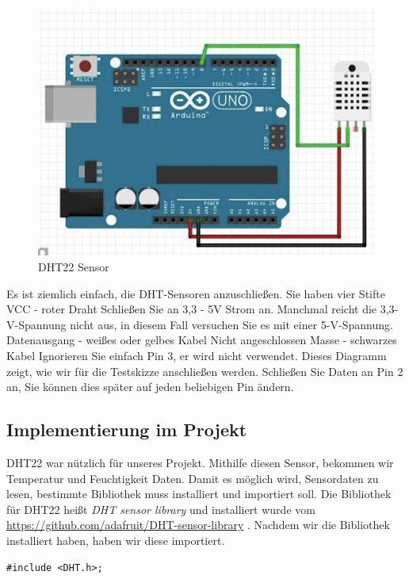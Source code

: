 \documentclass[conference]{IEEEtran}
\begin{document}
	
\begin{figure}[h]
	\begin{center}
		\includegraphics[scale=0.3]{dht22}
	\end{center}
	\caption{DHT22 Sensor}
\end{figure}

Es ist ziemlich einfach, die DHT-Sensoren anzuschließen. Sie haben vier Stifte VCC - roter Draht Schließen Sie an 3,3 - 5V Strom an. Manchmal reicht die 3,3-V-Spannung nicht aus, in diesem Fall versuchen Sie es mit einer 5-V-Spannung. Datenausgang - weißes oder gelbes Kabel Nicht angeschlossen Masse - schwarzes Kabel Ignorieren Sie einfach Pin 3, er wird nicht verwendet. Dieses Diagramm zeigt, wie wir für die Testskizze anschließen werden. Schließen Sie Daten an Pin 2 an, Sie können dies später auf jeden beliebigen Pin ändern.

\subsection{Implementierung im Projekt}
DHT22 war nützlich für unseres Projekt. Mithilfe diesen Sensor, bekommen wir Temperatur und Feuchtigkeit Daten. Damit es möglich wird, Sensordaten zu lesen, bestimmte Bibliothek muss installiert und importiert soll. Die Bibliothek für DHT22 heißt \textit{DHT sensor library} und installiert wurde vom \url{https://github.com/adafruit/DHT-sensor-library} . Nachdem wir die Bibliothek installiert haben, haben wir diese importiert.


\begin{lstlisting}[style=CStyle]
#include <DHT.h>;
\end{lstlisting}
\end{document}
